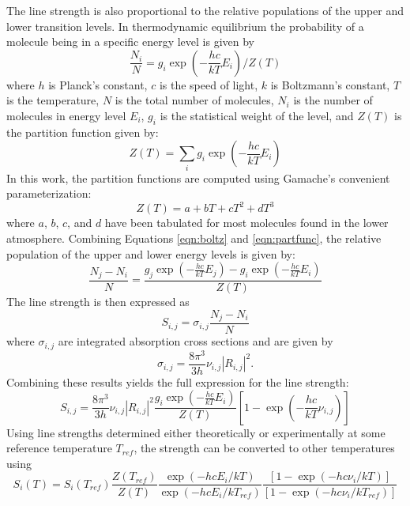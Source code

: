 \documentclass[11pt]{article}
\begin{document}
The line strength is also proportional to the relative populations of 
the upper and lower transition levels.  In thermodynamic equilibrium 
the probability of a molecule being in a specific energy level is given by
\begin{equation}
\frac{N_i}{N}=g_i \exp(-\frac{hc}{kT}E_i)/Z(T)
\label{eqn:boltz}
\end{equation}
where $h$ is Planck's constant, $c$ is the speed of light, $k$ is 
Boltzmann's constant, $T$ is the temperature, $N$ is the total number of
molecules, $N_i$ is the number of molecules in energy level $E_i$, $g_i$ is 
the statistical weight of the level, and $Z(T)$ is the partition function 
given by:
\begin{equation}
Z(T)=\sum_i g_i \exp(-\frac{hc}{kT}E_i)
\label{eqn:partfunc}
\end{equation}
In this work, the partition functions are computed using Gamache's
\cite{gam:90} convenient parameterization: 
\begin{equation}
Z(T) = a + b T + c T^2 + d T^3
\label{eqn:gamache}
\end{equation}
where $a$, $b$, $c$, and $d$ have been tabulated for most molecules found
in the lower atmosphere.  Combining Equations \ref{eqn:boltz} and 
\ref{eqn:partfunc}, the relative 
population of the upper and lower energy levels is given by:
\begin{equation}
 \frac{N_j - N_i}{N}=
  \frac{g_j \exp(-\frac{hc}{kT}E_j) - g_i\exp(-\frac{hc}{kT}E_i)}{Z(T)}
\end{equation}
The line strength is then expressed as 
\begin{equation}
S_{i,j}=\sigma_{i,j}\frac{N_j - N_i}{N}
\end{equation}
where $\sigma_{i,j}$ are integrated absorption cross sections and are 
given by
\begin{equation}
\sigma_{i,j}=\frac{8\pi^3}{3h}\nu_{i,j}|R_{i,j}|^2.
\end{equation}
Combining these results yields the full expression for the line strength:
\begin{equation}
S_{i,j}=\frac{8\pi^3}{3h}\nu_{i,j}|R_{i,j}|^2 
 \frac{g_i \exp(-\frac{hc}{kT}E_i)}{Z(T)}[1 -\exp(-\frac{hc}{kT}\nu_{i,j})]
\end{equation}
Using line strengths determined either theoretically or experimentally at
some reference temperature $T_{ref}$, the strength can be converted to other
temperatures using
\begin{equation}
 S_i (T) = S_i (T_{ref})
 \frac{ Z(T_{ref}) }{ Z(T) }
 \frac{ \exp(-hcE_i /kT) }{ \exp(-hcE_i /kT_{ref}) }
 \frac{ [1-\exp(-hc\nu_i /kT)] }{ [1-\exp(-hc\nu_i /kT_{ref})] }
\label{eqn:linestren}
\end{equation}
\end{document}
